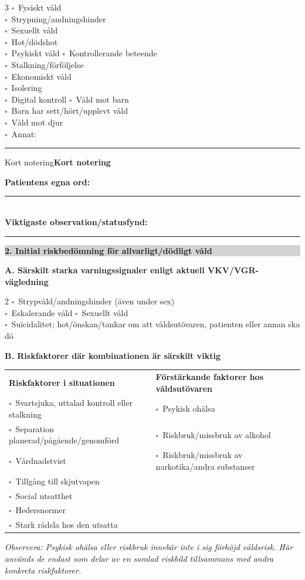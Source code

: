 \documentclass[10pt,a4paper]{article}
\newcommand{\cb}{\(\square\)}
\newenvironment{thinbox}[1]{%
  \def\boxtitle{#1}%
  \begin{lrbox}{\legacybox}%
  \begin{minipage}{0.955\linewidth}%
  \ifx\boxtitle\empty\else\textbf{#1}\par\smallskip\fi
}{%
  \end{minipage}%
  \end{lrbox}%
  \par\smallskip\noindent
  \fcolorbox{midgray}{white}{\usebox{\legacybox}}%
  \par\smallskip
}
\newcommand{\sectionbar}[1]{%
  \par\smallskip\noindent
  \colorbox{lightgray}{\parbox{0.965\linewidth}{\bfseries #1}}%
  \par\smallskip
}
\begin{document}
\begin{multicols}{3}
\cb\ Fysiskt våld\\
\cb\ Strypning/andningshinder\\
\cb\ Sexuellt våld\\
\cb\ Hot/dödshot\\
\cb\ Psykiskt våld
\columnbreak
\cb\ Kontrollerande beteende\\
\cb\ Stalkning/förföljelse\\
\cb\ Ekonomiskt våld\\
\cb\ Isolering\\
\cb\ Digital kontroll
\columnbreak
\cb\ Våld mot barn\\
\cb\ Barn har sett/hört/upplevt våld\\
\cb\ Våld mot djur\\
\cb\ Annat: \rule{24mm}{0.32pt}
\end{multicols}

\begin{thinbox}{Kort notering}
\textbf{Patientens egna ord:}\quad \rule{0.72\linewidth}{0.32pt}\\[1.8mm]
\textbf{Viktigaste observation/statusfynd:}\quad \rule{0.61\linewidth}{0.32pt}
\end{thinbox}

\sectionbar{2. Initial riskbedömning för allvarligt/dödligt våld}

\textbf{A. Särskilt starka varningssignaler enligt aktuell VKV/VGR-vägledning}\\
\begin{multicols}{2}
\cb\ Strypvåld/andningshinder (även under sex)\\
\cb\ Eskalerande våld
\columnbreak
\cb\ Sexuellt våld\\
\cb\ Suicidalitet; hot/önskan/tankar om att våldsutövaren, patienten eller annan ska dö
\end{multicols}

\textbf{B. Riskfaktorer där kombinationen är särskilt viktig}\\
\begin{tabularx}{\linewidth}{X X}
\textbf{Riskfaktorer i situationen} & \textbf{Förstärkande faktorer hos våldsutövaren}\\[0.5mm]
\cb\ Svartsjuka, uttalad kontroll eller stalkning & \cb\ Psykisk ohälsa\\
\cb\ Separation planerad/pågående/genomförd & \cb\ Riskbruk/missbruk av alkohol\\
\cb\ Vårdnadstvist & \cb\ Riskbruk/missbruk av narkotika/andra substanser\\
\cb\ Tillgång till skjutvapen & \\
\cb\ Social utsatthet & \\
\cb\ Hedersnormer & \\
\cb\ Stark rädsla hos den utsatta & \\
\end{tabularx}
\textit{Observera: Psykisk ohälsa eller riskbruk innebär inte i sig förhöjd våldsrisk. Här används de endast som delar av en samlad riskbild tillsammans med andra konkreta riskfaktorer.}
\end{document}

